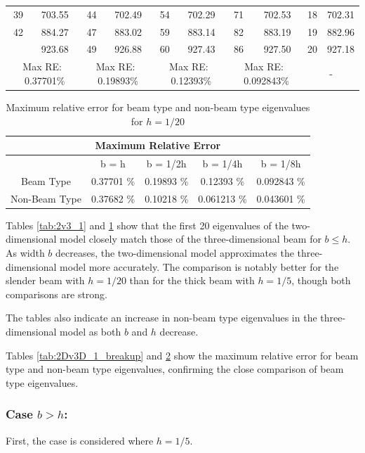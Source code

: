 \begin{table}[ht]
{{\begin{tabular}{|cc|cc|cc|cc||cc|}
		{39} & 703.55 & {44} & 702.49 & {54} & 702.29 & {71} & 702.53 & {18} & {702.31} \\
		{42} & 884.27 & {47} & 883.02 & {59} & 883.14 & {82} & 883.19 & {19} & {882.96} \\
		\rowcolor{lightgray}{44} & 923.68 & {49} & 926.88 & {60} & 927.43 & {86} & 927.50 & {20} & {927.18} \\
		\hline
		\hline
		\multicolumn{2}{|c|}{Max RE: \  0.37701\%} &\multicolumn{2}{c|}{Max RE: \ 0.19893\%}  & \multicolumn{2}{c|}{Max RE: \  0.12393\%}  & \multicolumn{2}{c||}{Max RE: \ 0.092843\%}& \multicolumn{2}{c|}{-} \\
		\hline
	\end{tabular}%
	\label{tab:2v3_2}%
}}
\end{table}%
\FloatBarrier

\begin{table}[htbp]
	\centering
	\caption{Maximum relative error for beam type and non-beam type eigenvalues for $h = 1/20$}
	\begin{tabular}{|c|cccc|}
		\hline
		\multicolumn{5}{|c|}{Maximum Relative Error} \\
		\hline
		\hline
		& {b = h} & {b = 1/2h} & {b = 1/4h} & {b = 1/8h} \\
		\hline
		Beam Type & 0.37701 \% & 0.19893 \% & 0.12393 \% & 0.092843 \% \\
		Non-Beam Type & 0.37682 \% & 0.10218 \% & 0.061213 \% & 0.043601 \% \\
		\hline
	\end{tabular}%
	\label{tab:2v3_2_split}%
\end{table}%
\FloatBarrier


Tables \ref{tab:2v3_1} and \ref{tab:2v3_2} show that the first 20 eigenvalues of the two-dimensional model closely match those of the three-dimensional beam for $b \leq h$. As width $b$ decreases, the two-dimensional model approximates the three-dimensional model more accurately. The comparison is notably better for the slender beam with $h = 1/20$ than for the thick beam with $h = 1/5$, though both comparisons are strong.

The tables also indicate an increase in non-beam type eigenvalues in the three-dimensional model as both $b$ and $h$ decrease.

Tables \ref{tab:2Dv3D_1_breakup} and \ref{tab:2v3_2_split} show the maximum relative error for beam type and non-beam type eigenvalues, confirming the close comparison of beam type eigenvalues.


\subsubsection*{Case $b > h$:}
First, the case is considered where $h = 1/5$.

